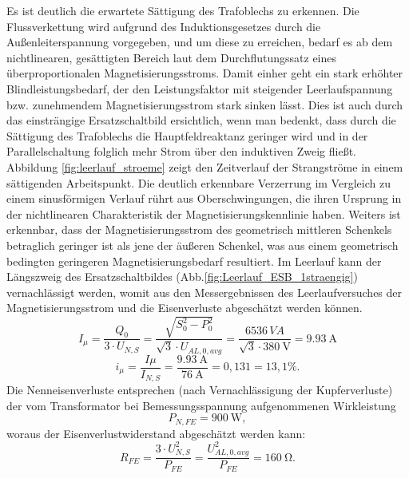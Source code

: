 \noindent
Es ist deutlich die erwartete Sättigung des Trafoblechs zu erkennen. Die Flussverkettung wird aufgrund des Induktionsgesetzes durch die Außenleiterspannung vorgegeben, und um diese zu erreichen, bedarf es ab dem nichtlinearen, gesättigten Bereich laut dem Durchflutungssatz eines überproportionalen Magnetisierungsstroms. Damit einher geht ein stark erhöhter Blindleistungsbedarf, der den Leistungsfaktor mit steigender Leerlaufspannung bzw. zunehmendem Magnetisierungsstrom stark sinken lässt. Dies ist auch durch das einsträngige Ersatzschaltbild ersichtlich, wenn man bedenkt, dass durch die Sättigung des Trafoblechs die Hauptfeldreaktanz geringer wird und in der Parallelschaltung folglich mehr Strom über den induktiven Zweig fließt.  
\noindent Abbildung \ref{fig:leerlauf_stroeme} zeigt den Zeitverlauf der Strangströme in einem sättigenden Arbeitspunkt. Die deutlich erkennbare Verzerrung im Vergleich zu einem sinusförmigen Verlauf rührt aus Oberschwingungen, die ihren Ursprung in der nichtlinearen Charakteristik der Magnetisierungskennlinie haben. Weiters ist erkennbar, dass der Magnetisierungsstrom des geometrisch mittleren Schenkels betraglich geringer ist als jene der äußeren Schenkel, was aus einem geometrisch bedingten geringeren Magnetisierungsbedarf resultiert.  
Im Leerlauf kann der Längszweig des Ersatzschaltbildes (Abb.\;\ref{fig:Leerlauf_ESB_1straengig}) vernachlässigt werden, womit aus den Messergebnissen des Leerlaufversuches der Magnetisierungsstrom und die Eisenverluste abgeschätzt werden können.
\begin{equation}
    I_\mu = \frac{Q_0}{3\cdot U_{N,S}}=\frac{\sqrt{S_0^2-P_0^2}}{\sqrt{3}\cdot U_{AL,0,avg}}=\frac{6536\,VA}{\sqrt{3}\cdot \SI{380}{\volt}}=\SI{9.93}{\ampere}
\end{equation}
\begin{equation}
    i_\mu = \frac{I\mu}{I_{N,S}}=\frac{\SI{9.93}{\ampere}}{\SI{76}{\ampere}}=0,131=13,1\%.
\end{equation}
Die Nenneisenverluste entsprechen (nach Vernachlässigung der Kupferverluste) der vom Transformator bei Bemessungsspannung aufgenommenen Wirkleistung
\begin{equation}
    P_{N,FE}=\SI{900}{\watt},
\end{equation}
woraus der Eisenverlustwiderstand abgeschätzt werden kann:
\begin{equation}
    R_{FE}=\frac{3\cdot U_{N,S}^2}{P_{FE}}=\frac{U_{AL,0,avg}^2}{P_{FE}}=\SI{160}{\ohm}.
\end{equation}
